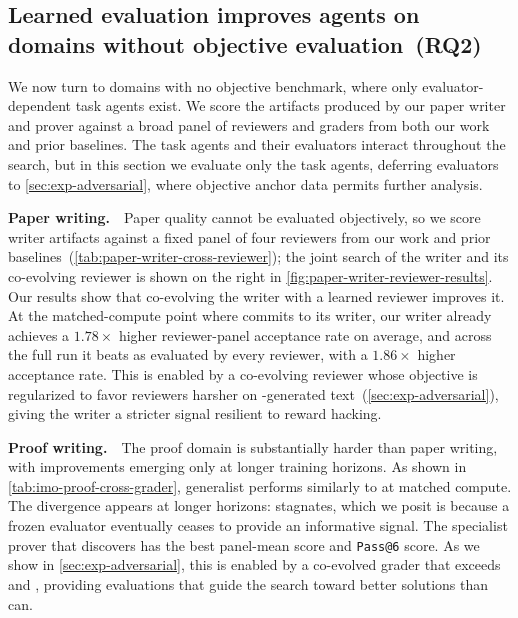

\subsection{Learned evaluation improves agents on domains without objective evaluation~(RQ2)}
\label{sec:exp-writer}






We now turn to domains with no objective benchmark, where only evaluator-dependent task agents exist. We score the artifacts produced by our paper writer and prover against a broad panel of reviewers and graders from both our work and prior baselines. The task agents and their evaluators interact throughout the search, but in this section we evaluate only the task agents, deferring evaluators to \cref{sec:exp-adversarial}, where objective anchor data permits further analysis.



\noindent\textbf{Paper writing.}~~Paper quality cannot be evaluated objectively, so we score writer artifacts against a fixed panel of four reviewers from our work and prior baselines~(\cref{tab:paper-writer-cross-reviewer}); the joint search of the writer and its co-evolving reviewer is shown on the right in \cref{fig:paper-writer-reviewer-results}. Our results show that co-evolving the writer with a learned reviewer improves it. At the matched-compute point where \hgmh commits to its writer, our writer already achieves a $1.78\times$ higher reviewer-panel acceptance rate on average, and across the full run it beats \hgmh as evaluated by every reviewer, with a $1.86\times$ higher acceptance rate. This is enabled by a co-evolving reviewer whose objective is regularized to favor reviewers harsher on \AI-generated text~(\cref{sec:exp-adversarial}), giving the writer a stricter signal resilient to reward hacking.







\noindent\textbf{Proof writing.}~~The proof domain is substantially harder than paper writing, with improvements emerging only at longer training horizons. As shown in \cref{tab:imo-proof-cross-grader}, \theourmethod generalist performs similarly to \hgmh at matched compute. The divergence appears at longer horizons: \hgmh stagnates, which we posit is because a frozen evaluator eventually ceases to provide an informative signal. The specialist prover that \ourmethod discovers has the best panel-mean score and \texttt{Pass@6} score. As we show in \cref{sec:exp-adversarial}, this is enabled by a co-evolved grader that exceeds \proofautograder and \hgmh, providing evaluations that guide the search toward better solutions than \hgmh can.



